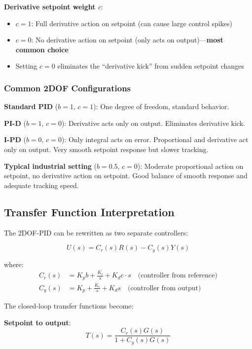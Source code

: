 \textbf{Derivative setpoint weight $c$}:
\begin{itemize}
    \item $c = 1$: Full derivative action on setpoint (can cause large control spikes)
    \item $c = 0$: No derivative action on setpoint (only acts on output)---\textbf{most common choice}
    \item Setting $c = 0$ eliminates the ``derivative kick'' from sudden setpoint changes
\end{itemize}

\subsubsection{Common 2DOF Configurations}

\textbf{Standard PID} ($b = 1$, $c = 1$): One degree of freedom, standard behavior.

\textbf{PI-D} ($b = 1$, $c = 0$): Derivative acts only on output. Eliminates derivative kick.

\textbf{I-PD} ($b = 0$, $c = 0$): Only integral acts on error. Proportional and derivative act only on output. Very smooth setpoint response but slower tracking.

\textbf{Typical industrial setting} ($b = 0.5$, $c = 0$): Moderate proportional action on setpoint, no derivative action on setpoint. Good balance of smooth response and adequate tracking speed.

\subsection{Transfer Function Interpretation}
\label{subsec:2dof_transfer}

The 2DOF-PID can be rewritten as two separate controllers:

\begin{equation}
U(s) = C_r(s) R(s) - C_y(s) Y(s)
\end{equation}

where:
\begin{align}
C_r(s) &= K_p b + \frac{K_i}{s} + K_d c \cdot s \quad \text{(controller from reference)} \\
C_y(s) &= K_p + \frac{K_i}{s} + K_d s \quad \text{(controller from output)}
\end{align}

The closed-loop transfer functions become:

\textbf{Setpoint to output}:
\begin{equation}
T(s) = \frac{C_r(s) G(s)}{1 + C_y(s) G(s)}
\end{equation}

